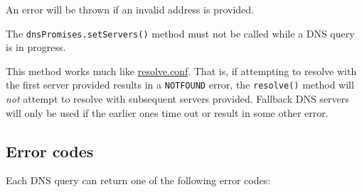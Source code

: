 An error will be thrown if an invalid address is provided.

The \texttt{dnsPromises.setServers()} method must not be called while a
DNS query is in progress.

This method works much like
\href{https://man7.org/linux/man-pages/man5/resolv.conf.5.html}{resolve.conf}.
That is, if attempting to resolve with the first server provided results
in a \texttt{NOTFOUND} error, the \texttt{resolve()} method will
\emph{not} attempt to resolve with subsequent servers provided. Fallback
DNS servers will only be used if the earlier ones time out or result in
some other error.

\subsection{Error codes}\label{error-codes}

Each DNS query can return one of the following error codes:

